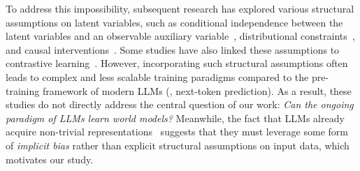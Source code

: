 To address this impossibility, subsequent research has explored various structural assumptions on latent variables, such as conditional independence between the latent variables and an observable auxiliary variable~\citep{hyvarinen_nonlinear_2019,khemakhem_variational_2020,lee_predicting_2021}, distributional constraints~\citep{zimmermann_contrastive_2021,wei_why_2021}, and causal interventions~\citep{von_kugelgen_self-supervised_2021,ahuja_interventional_2023,von_kugelgen_nonparametric_2023}. Some studies have also linked these assumptions to contrastive learning~\citep{hyvarinen_nonlinear_2019,tosh_contrastive_2021,zimmermann_contrastive_2021}. However, incorporating such structural assumptions often leads to complex and less scalable training paradigms compared to the pre-training framework of modern LLMs (\ie, next-token prediction). As a result, these studies do not directly address the central question of our work: \emph{Can the ongoing paradigm of LLMs learn world models?} Meanwhile, the fact that LLMs already acquire non-trivial representations~\citep{li2021implicit,bricken2023towards,marks_geometry_2023,gurnee_language_2024} suggests that they must leverage some form of \emph{implicit bias} rather than explicit structural assumptions on input data, which motivates our study.



